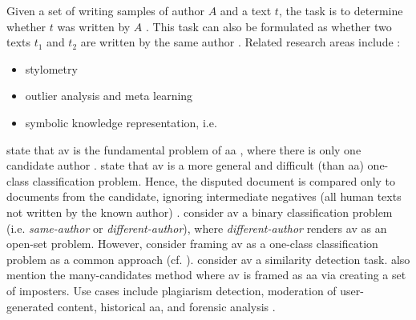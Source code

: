 \begin{definition}
    [\ac{av}]   %
    Given a set of writing samples of author $A$ and a text $t$,    %
    the task is to determine whether $t$ was written by $A$ \cite{stein_intrinsic_2011,stamatatos_survey_2009,koppel_authorship_2011,tyo_state_2022,kocher_unine_2015}.
    This task can also be formulated as whether two texts $t_1$ and $t_2$ are written by the same author 
    \cite{bevendorff_generalizing_2019,bevendorff_divergence_based_2020,embarcadero_ruiz_graph_based_2022,rivera_soto_learning_2021,ordonez_will_2020,futrzynski_pairwise_2021,weerasinghe_feature_vector_difference_2021,llm_detection_av_2025}.
    Related research areas include \cite{stein_intrinsic_2011}:
    \begin{itemize}
        \item stylometry
        \item outlier analysis and meta learning
        \item symbolic knowledge representation, i.e. 
    \end{itemize}
    \citet{tyo_state_2022} state that \ac{av} is the fundamental problem of \ac{aa} \cite{tyo_state_2022}, 
    where there is only one candidate author \cite{barlas_cross_domain_2020}.
    \citet{llm_detection_av_2025} state that \ac{av} is a more general and difficult (than \ac{aa}) one-class classification problem.
    Hence, the disputed document is compared only to documents from the candidate, 
    ignoring intermediate negatives (all human texts not written by the known author) \cite{llm_detection_av_2025,neal_surveying_2018}.
    \citet{neal_surveying_2018} consider \ac{av} a binary classification problem (i.e. \textit{same-author} or \textit{different-author}), 
    where \textit{different-author} renders \ac{av} as an open-set problem.
    However, \citet{neal_surveying_2018} consider framing \ac{av} as a one-class classification problem as a common approach (cf. \cite{llm_detection_av_2025}).
    \citet{elmanarelbouanani_authorship_2014} consider \ac{av} a similarity detection task.
    \citet{neal_surveying_2018} also mention the many-candidates method where \ac{av} is framed as \ac{aa} via creating a set of imposters.
    Use cases include plagiarism detection, moderation of user-generated content, historical \ac{aa}, and forensic analysis \cite{rivera_soto_learning_2021}.
\end{definition}

